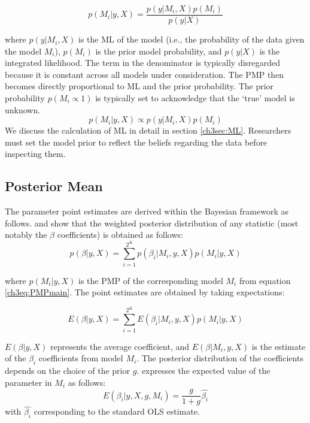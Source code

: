 \begin{refsection}
\begin{subappendices}
    \begin{equation}\label{ch3eq:PMPmain}
    p(M_{i} \vert y,X) = \frac{p(y\vert M_{i},X)p(M_{i})}{p(y \vert X)}
    \end{equation}
    
    where $p(y\vert M_{i},X)$ is the \ac{ML} of the model (i.e., the probability of the data given the model $M_{i}$), $p(M_{i})$ is the prior model probability, and $p(y\vert X)$ is the integrated likelihood. The term in the denominator is typically disregarded because it is constant across all models under consideration. The \ac{PMP} then becomes directly proportional to ML and the prior probability. The prior probability $p(M_{i} \propto 1)$ is typically set to acknowledge that the `true' model is unknown.
    \begin{equation}
    p(M_{i}\vert y,X) \propto p(y\vert M_{i},X)p(M_{i})
    \end{equation}
    We discuss the calculation of ML in detail in section \ref{ch3sec:ML}. Researchers must set the model prior to reflect the beliefs regarding the data before inspecting them. 
    \subsection*{Posterior Mean}
    The parameter point estimates are derived within the Bayesian framework as follows. \textcite{Zeugner2011} and \textcite{MoralBenito2012} show that the weighted posterior distribution of any statistic (most notably the $\beta$ coefficients) is obtained as follows:
    \begin{equation}\label{ch3eq:parest}
    p(\beta \vert y, X) = \sum_{i=1}^{2^{K}} p(\beta_{i} \vert M_{i},y,X)p(M_{i} \vert y,X)
    \end{equation}
    
    where $p(M_{i} \vert y, X)$ is the \ac{PMP} of the corresponding model $M_{i}$ from equation \ref{ch3eq:PMPmain}. The point estimates are obtained by taking expectations:
    
    \begin{equation}\label{ch3eq:pointparest}
    E(\beta \vert y, X) = \sum_{i=1}^{2^{K}} E(\beta_{i} \vert M_{i},y,X)p(M_{i} \vert y,X)
    \end{equation}
    
    $E(\beta \vert y, X)$ represents the average coefficient, and $E(\beta \vert M_{i},y,X)$ is the estimate of the $\beta_{i}$ coefficients from model $M_{i}$. The posterior distribution of the coefficients depends on the choice of the prior $g$. \textcite{Zeugner2011} expresses the expected value of the parameter in $M_{i}$ as follows:
    \begin{equation}\label{ch3eq:postdist}
    E(\beta_{i} \vert y,X,g,M_{i}) = \frac{g}{1+g}\hat{\beta_{i}}
    \end{equation}
    with $\hat{\beta_{i}}$ corresponding to the standard OLS estimate.
    

\end{subappendices}
\end{refsection}
